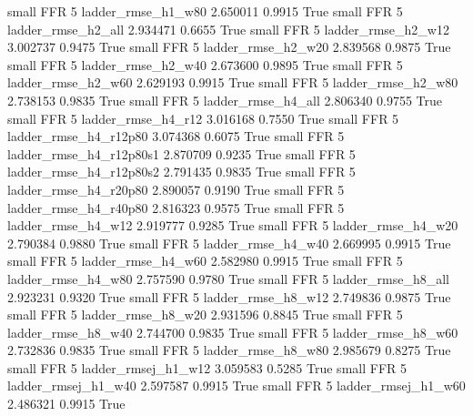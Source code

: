      small      FFR                 5       ladder_rmse_h1_w80   2.650011      0.9915    True
     small      FFR                 5       ladder_rmse_h2_all   2.934471      0.6655    True
     small      FFR                 5       ladder_rmse_h2_w12   3.002737      0.9475    True
     small      FFR                 5       ladder_rmse_h2_w20   2.839568      0.9875    True
     small      FFR                 5       ladder_rmse_h2_w40   2.673600      0.9895    True
     small      FFR                 5       ladder_rmse_h2_w60   2.629193      0.9915    True
     small      FFR                 5       ladder_rmse_h2_w80   2.738153      0.9835    True
     small      FFR                 5       ladder_rmse_h4_all   2.806340      0.9755    True
     small      FFR                 5       ladder_rmse_h4_r12   3.016168      0.7550    True
     small      FFR                 5    ladder_rmse_h4_r12p80   3.074368      0.6075    True
     small      FFR                 5  ladder_rmse_h4_r12p80s1   2.870709      0.9235    True
     small      FFR                 5  ladder_rmse_h4_r12p80s2   2.791435      0.9835    True
     small      FFR                 5    ladder_rmse_h4_r20p80   2.890057      0.9190    True
     small      FFR                 5    ladder_rmse_h4_r40p80   2.816323      0.9575    True
     small      FFR                 5       ladder_rmse_h4_w12   2.919777      0.9285    True
     small      FFR                 5       ladder_rmse_h4_w20   2.790384      0.9880    True
     small      FFR                 5       ladder_rmse_h4_w40   2.669995      0.9915    True
     small      FFR                 5       ladder_rmse_h4_w60   2.582980      0.9915    True
     small      FFR                 5       ladder_rmse_h4_w80   2.757590      0.9780    True
     small      FFR                 5       ladder_rmse_h8_all   2.923231      0.9320    True
     small      FFR                 5       ladder_rmse_h8_w12   2.749836      0.9875    True
     small      FFR                 5       ladder_rmse_h8_w20   2.931596      0.8845    True
     small      FFR                 5       ladder_rmse_h8_w40   2.744700      0.9835    True
     small      FFR                 5       ladder_rmse_h8_w60   2.732836      0.9835    True
     small      FFR                 5       ladder_rmse_h8_w80   2.985679      0.8275    True
     small      FFR                 5      ladder_rmsej_h1_w12   3.059583      0.5285    True
     small      FFR                 5      ladder_rmsej_h1_w40   2.597587      0.9915    True
     small      FFR                 5      ladder_rmsej_h1_w60   2.486321      0.9915    True
